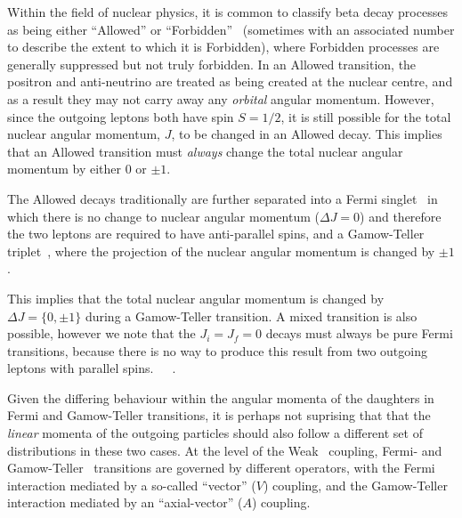Within the field of nuclear physics, it is common to classify beta decay processes as being either ``Allowed'' or ``Forbidden''~ (sometimes with an associated number to describe the extent to which it is Forbidden), where Forbidden processes are generally suppressed but not truly forbidden.  In an Allowed transition, the positron and anti-neutrino are treated as being created at the nuclear centre, and as a result they may not carry away any \emph{orbital} angular momentum.  However, since the outgoing leptons both have spin $S=1/2$, it is still possible for the total nuclear angular momentum, $J$, to be changed in an Allowed decay.  This implies that an Allowed transition must \emph{always} change the total nuclear angular momentum by either $0$ or $\pm1$.  
~

The Allowed decays traditionally are further separated into a Fermi singlet~ in which there is no change to nuclear angular momentum ($\Delta J = 0$) and therefore the two leptons are required to have anti-parallel spins, and a Gamow-Teller triplet~\cite{severijns_beck_cuncic_2006}, where the projection of the nuclear angular momentum is changed by $\pm1$.%

This implies that the total nuclear angular momentum is changed by $\Delta J = \{0, \pm1\}$ during a Gamow-Teller transition.  A mixed transition is also possible, however we note that the $J_i = J_f = 0$ decays must always be pure Fermi transitions, because there is no way to produce this result from two outgoing leptons with parallel spins.~\cite{krane}~\cite{wong1990}~\cite{severijns_beck_cuncic_2006}.

Given the differing behaviour within the angular momenta of the daughters in Fermi and Gamow-Teller transitions, it is perhaps not suprising that that the \emph{linear} momenta of the outgoing particles should also follow a different set of distributions in these two cases.  At the level of the Weak~ coupling, Fermi- and Gamow-Teller~ transitions are governed by different operators, with the Fermi interaction mediated by a so-called ``vector'' ($V$) coupling, and the Gamow-Teller interaction mediated by an ``axial-vector'' ($A$) coupling.
~

